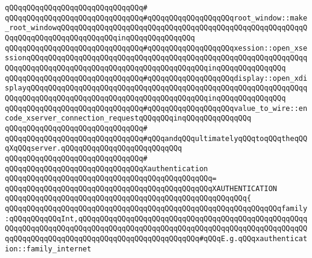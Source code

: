 \verb|qQQqqQQqqQQqqQQqqQQqqQQqqQQqqQQq#|\newline
\verb|qQQqqQQqqQQqqQQqqQQqqQQqqQQqqQQq#qQQqqQQqqQQqqQQqqQQqroot_window::make_root_windowqQQqqQQqqQQqqQQqqQQqqQQqqQQqqQQqqQQqqQQqqQQqqQQqqQQqqQQqqQQqqQQqqQQqqQQqqQQqqQQqqQQqinqQQqqQQqqQQqqQQq|\newline
\verb|qQQqqQQqqQQqqQQqqQQqqQQqqQQqqQQq#qQQqqQQqqQQqqQQqqQQqxession::open_xsessionqQQqqQQqqQQqqQQqqQQqqQQqqQQqqQQqqQQqqQQqqQQqqQQqqQQqqQQqqQQqqQQqqQQqqQQqqQQqqQQqqQQqqQQqqQQqqQQqqQQqqQQqqQQqqQQqinqQQqqQQqqQQqqQQq|\newline
\verb|qQQqqQQqqQQqqQQqqQQqqQQqqQQqqQQq#qQQqqQQqqQQqqQQqqQQqdisplay::open_xdisplayqQQqqQQqqQQqqQQqqQQqqQQqqQQqqQQqqQQqqQQqqQQqqQQqqQQqqQQqqQQqqQQqqQQqqQQqqQQqqQQqqQQqqQQqqQQqqQQqqQQqqQQqqQQqqQQqinqQQqqQQqqQQqqQQq|\newline
\verb|qQQqqQQqqQQqqQQqqQQqqQQqqQQqqQQq#qQQqqQQqqQQqqQQqqQQqvalue_to_wire::encode_xserver_connection_requestqQQqqQQqinqQQqqQQqqQQqqQQq|\newline
\verb|qQQqqQQqqQQqqQQqqQQqqQQqqQQqqQQq#|\newline
\verb|qQQqqQQqqQQqqQQqqQQqqQQqqQQqqQQq#qQQqandqQQqultimatelyqQQqtoqQQqtheqQQqXqQQqserver.qQQqqQQqqQQqqQQqqQQqqQQqqQQq|\newline
\verb|qQQqqQQqqQQqqQQqqQQqqQQqqQQqqQQq#|\newline
\verb|qQQqqQQqqQQqqQQqqQQqqQQqqQQqqQQqXauthentication|\newline
\verb|qQQqqQQqqQQqqQQqqQQqqQQqqQQqqQQqqQQqqQQqqQQqqQQq=|\newline
\verb|qQQqqQQqqQQqqQQqqQQqqQQqqQQqqQQqqQQqqQQqqQQqqQQqXAUTHENTICATION|\newline
\verb|qQQqqQQqqQQqqQQqqQQqqQQqqQQqqQQqqQQqqQQqqQQqqQQqqQQqqQQq{|\newline
\verb|qQQqqQQqqQQqqQQqqQQqqQQqqQQqqQQqqQQqqQQqqQQqqQQqqQQqqQQqqQQqqQQqfamily:qQQqqQQqqQQqInt,qQQqqQQqqQQqqQQqqQQqqQQqqQQqqQQqqQQqqQQqqQQqqQQqqQQqqQQqqQQqqQQqqQQqqQQqqQQqqQQqqQQqqQQqqQQqqQQqqQQqqQQqqQQqqQQqqQQqqQQqqQQqqQQqqQQqqQQqqQQqqQQqqQQqqQQqqQQqqQQqqQQqqQQq#qQQqE.g.qQQqxauthentication::family_internet|\newline
